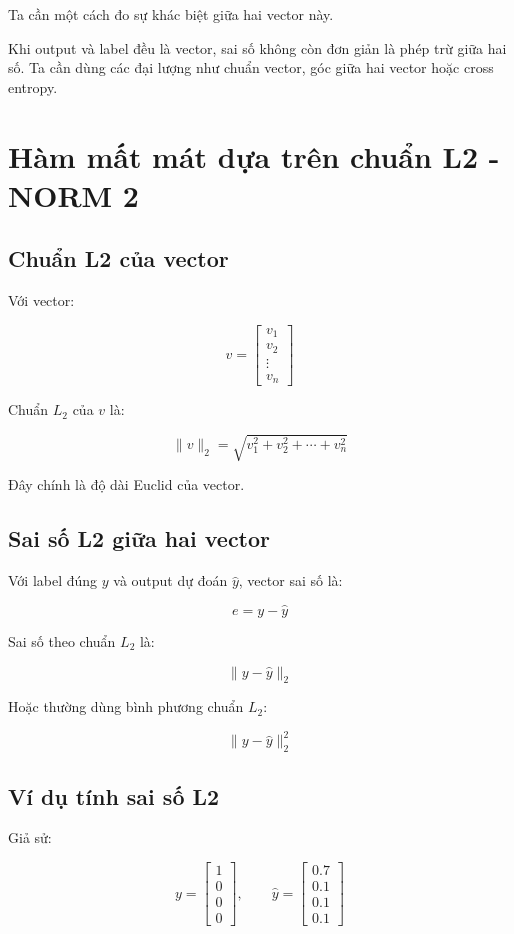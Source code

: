 Ta cần một cách đo sự khác biệt giữa hai vector này.

\begin{ghinho}
Khi output và label đều là vector, sai số không còn đơn giản là phép trừ giữa hai số. Ta cần dùng các đại lượng như chuẩn vector, góc giữa hai vector hoặc cross entropy.
\end{ghinho}

\section{Hàm mất mát dựa trên chuẩn L2 - NORM 2}

\subsection{Chuẩn L2 của vector}

Với vector:

\[
    v =
    \begin{bmatrix}
    v_1\\
    v_2\\
    \vdots\\
    v_n
    \end{bmatrix}
\]

Chuẩn $L_2$ của $v$ là:

\[
    \|v\|_2 = \sqrt{v_1^2+v_2^2+\cdots+v_n^2}
\]

Đây chính là độ dài Euclid của vector.

\subsection{Sai số L2 giữa hai vector}

Với label đúng $y$ và output dự đoán $\hat{y}$, vector sai số là:

\[
    e = y-\hat{y}
\]

Sai số theo chuẩn $L_2$ là:

\[
    \|y-\hat{y}\|_2
\]

Hoặc thường dùng bình phương chuẩn $L_2$:

\[
    \|y-\hat{y}\|_2^2
\]

\subsection{Ví dụ tính sai số L2}

Giả sử:

\[
    y =
    \begin{bmatrix}
    1\\0\\0\\0
    \end{bmatrix},
    \qquad
    \hat{y} =
    \begin{bmatrix}
    0.7\\0.1\\0.1\\0.1
    \end{bmatrix}
\]

